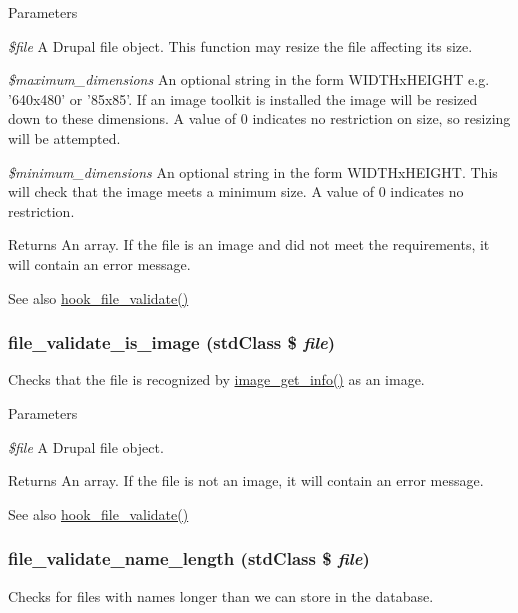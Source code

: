 \begin{DoxyParams}{Parameters}
\item[{\em \$file}]A Drupal file object. This function may resize the file affecting its size. \item[{\em \$maximum\_\-dimensions}]An optional string in the form WIDTHxHEIGHT e.g. '640x480' or '85x85'. If an image toolkit is installed the image will be resized down to these dimensions. A value of 0 indicates no restriction on size, so resizing will be attempted. \item[{\em \$minimum\_\-dimensions}]An optional string in the form WIDTHxHEIGHT. This will check that the image meets a minimum size. A value of 0 indicates no restriction.\end{DoxyParams}
\begin{DoxyReturn}{Returns}
An array. If the file is an image and did not meet the requirements, it will contain an error message.
\end{DoxyReturn}
\begin{DoxySeeAlso}{See also}
\hyperlink{group__hooks_gab1491b52a117229913448d787156e013}{hook\_\-file\_\-validate()} 
\end{DoxySeeAlso}
\hypertarget{group__file_ga4cf6d97afe1580b23a14d96fede02d01}{
\subsubsection[{file\_\-validate\_\-is\_\-image}]{\setlength{\rightskip}{0pt plus 5cm}file\_\-validate\_\-is\_\-image (stdClass \$ {\em file})}}
\label{group__file_ga4cf6d97afe1580b23a14d96fede02d01}
Checks that the file is recognized by \hyperlink{group__image_ga7b2603b2b9d073cc4db9a6200aa9c2a4}{image\_\-get\_\-info()} as an image.


\begin{DoxyParams}{Parameters}
\item[{\em \$file}]A Drupal file object.\end{DoxyParams}
\begin{DoxyReturn}{Returns}
An array. If the file is not an image, it will contain an error message.
\end{DoxyReturn}
\begin{DoxySeeAlso}{See also}
\hyperlink{group__hooks_gab1491b52a117229913448d787156e013}{hook\_\-file\_\-validate()} 
\end{DoxySeeAlso}
\hypertarget{group__file_gaca56a55a4d3ee635cddf38903c1ed367}{
\subsubsection[{file\_\-validate\_\-name\_\-length}]{\setlength{\rightskip}{0pt plus 5cm}file\_\-validate\_\-name\_\-length (stdClass \$ {\em file})}}
\label{group__file_gaca56a55a4d3ee635cddf38903c1ed367}
Checks for files with names longer than we can store in the database.


